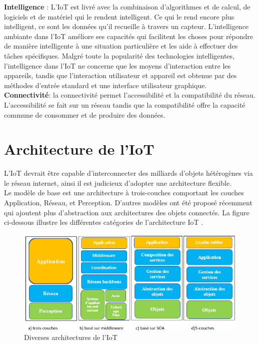 	\textbf{Intelligence} : L'IoT est livré avec la combinaison d'algorithmes et de calcul, de logiciels et de matériel qui le rendent intelligent. Ce qui le rend encore plus intelligent, ce sont les données qu’il recueille à travers un capteur. L'intelligence ambiante dans l'IoT améliore ses capacités qui facilitent les choses pour répondre de manière intelligente à une situation particulière et les aide à ef{\kern0pt}fectuer des tâches spécif{\kern0pt}iques. Malgré toute la popularité des technologies intelligentes, l'intelligence dans l'IoT ne concerne que les moyens d'interaction entre les appareils, tandis que l'interaction utilisateur et appareil est obtenue par des méthodes d'entrée standard et une interface utilisateur graphique.\\
	
	\textbf{Connectivité}: la connectivité permet l'accessibilité et la compatibilité du réseau. L'accessibilité se fait sur un réseau tandis que la compatibilité of{\kern0pt}fre la capacité commune de consommer et de produire des données.


	\section{Architecture de l’IoT}	
	L’IoT devrait être capable d’interconnecter des milliards d’objets hétérogènes via le réseau internet, ainsi il est judicieux d’adopter une architecture flexible.\\
	
Le modèle de base est une architecture à trois-couches comportant les couches Application, Réseau, et Perception. D’autres modèles ont été proposé récemment qui ajoutent plus d’abstraction aux architectures des objets connectés. La f{\kern0pt}igure ci-dessous illustre les dif{\kern0pt}férentes catégories de l’architecture IoT \cite{al2015iot}.\\

	\begin{figure}[H]
		\begin{center}
			\includegraphics[width=\textwidth]{IMAGES/ORIGINALS/diverses_architectures_de_l'IoT}
		\end{center}
		\caption{Diverses architectures de l'IoT}
	\end{figure}


